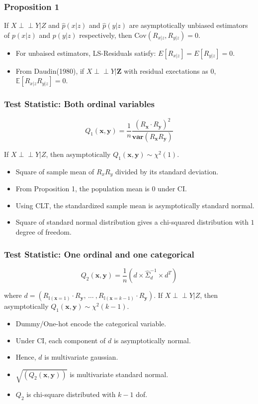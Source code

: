 \documentclass{beamer}
\def\ci{\perp\!\!\!\!\!\perp}
\begin{document}
\begin{frame}
	\frametitle{Proposition 1}
	If $ X \ci Y | Z $ and $ \hat{p}(x|z) $ and $ \hat{p}(y|z) $ are asymptotically
	unbiased estimators of $ p(x|z) $ and $ p(y|z) $ respectively, then 
	$ \mathrm{Cov}(R_{x|z}, R_{y|z}) = 0 $.	
	\vspace{1em}

	\begin{itemize}
		\setlength\itemsep{1em}
		\item For unbaised estimators, LS-Residuals satisfy:
			$ E[R_{x|z}] = E[R_{y|z}] = 0 $.
		\item From Daudin(1980), if $ X \ci Y | \bm{Z} $ with residual exectations
			as $ 0 $, $ \mathbb{E}[R_{x|z} R_{y|z}] = 0 $.
	\end{itemize}
\end{frame}

\begin{frame}
	\frametitle{Test Statistic: Both ordinal variables}
	$$ Q_1(\bm{x}, \bm{y}) = \frac{1}{n} \frac{(R_{\bm{x}} \cdot R_{\bm{y}})^2}{\bm{var}(R_{\bm{x}} R_{\bm{y}})} $$

	If $ X \ci Y | Z $, then asymptotically $ Q_1(\bm{x}, \bm{y}) \sim \chi^2(1) $.

	\begin{itemize}
		\setlength\itemsep{1em}
		\item Square of sample mean of $ R_x R_y $ divided by its
			standard deviation.
		\item From Proposition 1, the population mean is 0 under CI.
		\item Using CLT, the standardized sample mean is asymptotically
			standard normal.
		\item Square of standard normal distribution gives a
			chi-squared distribution with $ 1 $ degree of freedom.
	\end{itemize}
\end{frame}

\begin{frame}
	\frametitle{Test Statistic: One ordinal and one categorical}
	$$ Q_2(\bm{x}, \bm{y}) = \frac{1}{n} (d \times \hat{\Sigma}_d^{-1} \times d^T) $$

	where $ d = (R_{\mathbb{I}(\mathbf{x}=1)} \cdot R_{\mathbf{y}}, \, \ldots \ ,
		R_{\mathbb{I}(\mathbf{x}=k-1)} \cdot R_{\mathbf{y}})$.
	If $ X \ci Y | Z $, then asymptotically $ Q_1(\bm{x}, \bm{y}) \sim \chi^2(k-1) $.
	\begin{itemize}
		\setlength\itemsep{1em}
		\item Dummy/One-hot encode the categorical variable.
		\item Under CI, each component of $ d $ is asymptotically normal.
		\item Hence, $ d $ is multivariate gaussian.
		\item $ \sqrt{(Q_2(\bm{x}, \bm{y}))} $ is multivariate standard normal.
		\item $ Q_2 $ is chi-square distributed with $ k-1 $ dof.
	\end{itemize}
\end{frame}
\end{document}
